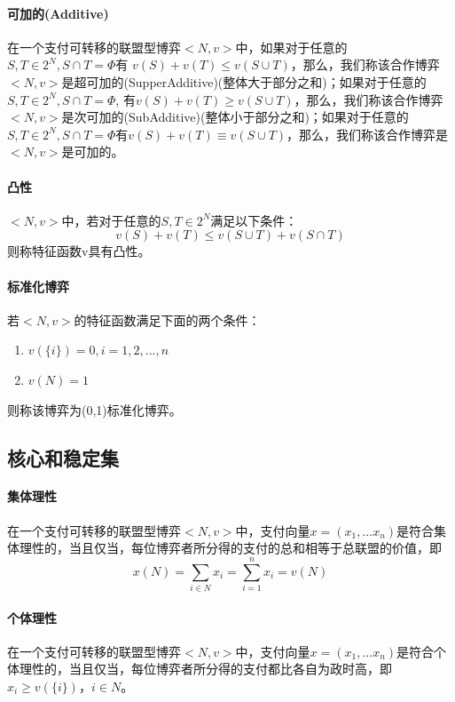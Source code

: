\documentclass[12pt,a4paper]{article}
\begin{document}
\paragraph{可加的(Additive)} 在一个支付可转移的联盟型博弈$<N,v>$中，如果对于任意的$S,T \in 2^N, S \cap T = \Phi$有 $v(S)+v(T)\leq v(S \cup T)$，那么，我们称该合作博弈$<N,v>$是超可加的(SupperAdditive)(整体大于部分之和)；如果对于任意的$S,T \in 2^N, S \cap T = \Phi$, 有$v(S)+v(T)\geq v(S \cup T)$，那么，我们称该合作博弈$<N,v>$是次可加的(SubAdditive)(整体小于部分之和)；如果对于任意的$S,T \in 2^N, S \cap T = \Phi$有$v(S)+v(T)\equiv v(S \cup T)$，那么，我们称该合作博弈是$<N,v>$是可加的。

\paragraph{凸性} $<N,v>$中，若对于任意的$S,T \in 2^N$满足以下条件：
\begin{equation}
	v(S)+v(T) \leq v(S \cup T) + v(S \cap T)
\end{equation}
则称特征函数v具有凸性。
\paragraph{标准化博弈} 若$<N,v>$的特征函数满足下面的两个条件：
\begin{enumerate}
	\item $v(\{i\}) = 0, i = 1,2,...,n$
	\item $v(N) = 1$
\end{enumerate}
则称该博弈为(0,1)标准化博弈。

\subsection{核心和稳定集}
\paragraph{集体理性} 在一个支付可转移的联盟型博弈$<N,v>$中，支付向量$x = (x_1,...x_n)$是符合集体理性的，当且仅当，每位博弈者所分得的支付的总和相等于总联盟的价值，即
\begin{equation}
	x(N) = \sum_{i \in N} x_i = \sum_{i=1}^n x_i = v(N)
\end{equation}

\paragraph{个体理性} 在一个支付可转移的联盟型博弈$<N,v>$中，支付向量$x = (x_1,...x_n)$是符合个体理性的，当且仅当，每位博弈者所分得的支付都比各自为政时高，即$x_i \geq v(\{i\})，i \in N$。
\end{document}
